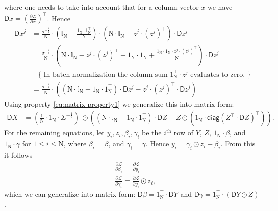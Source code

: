\documentclass{article}
\newcommand{\const}[1]{\ensuremath{\mathrm{#1}}} %
\newcommand{\func}[1]{\ensuremath{\textsf{#1}}} %
\newcommand{\Gradient}{\textsf{D}}
\newcommand{\Derivative}[2]{\ensuremath{\frac{\partial #1}{\partial #2}}}
\begin{document}
where one needs to take into account that for a column vector $x$ we have $\Gradient x = (\Derivative{\mathcal{L}}{x})^\top$.
Hence
\begin{align*}
    \Gradient x^j 
    &=
    \frac{\sigma^{-\frac{1}{2}}}{\const{N}}
    \cdot
    (\mathbb{I}_{\const{N}} - \frac{1_\const{N} \cdot 1_\const{N}^\top}{\const{N}})
    \cdot 
    \left( 
       \const{N} \cdot \mathbb{I}_{\const{N}} - z^j \cdot (z^j)^\top 
    \right)
    \cdot
    \Gradient z^j
    \\
    &=
    \frac{\sigma^{-\frac{1}{2}}}{\const{N}}
    \cdot
    (
      \const{N} \cdot \mathbb{I}_{\const{N}}
      - z^j \cdot (z^j)^\top
      - 1_\const{N} \cdot 1_\const{N}^\top
      + \frac{1_\const{N} \cdot 1_\const{N}^\top \cdot z^j \cdot (z^j)^\top}{\const{N}}
    )  
    \cdot
    \Gradient z^j
    \\     
      & \ \ \ \  \{ \; \text{In batch normalization the column sum $1_\const{N}^\top \cdot z^j$ evaluates to zero. } \}
    \\ 
    &=
    \frac{\sigma^{-\frac{1}{2}}}{\const{N}}
    \cdot
    (
      (\const{N} \cdot \mathbb{I}_{\const{N}} - 1_\const{N} \cdot 1_\const{N}^\top) \cdot \Gradient z^j
      - z^j \cdot (z^j)^\top \cdot \Gradient z^j
    )  
\end{align*}
Using property \eqref{eq:matrix-property1} we generalize this into matrix-form:
\begin{align} \label{eq:batch-normalization-backpropagation}
\Gradient X
     &= (\frac{1}{\const{N}} \cdot 1_\const{N} \cdot \Sigma^{-\frac{1}{2}}) ~\odot 
      \left(
              (\const{N} \cdot \mathbb{I}_\const{N} - 1_\const{N} \cdot 1_\const{N}^\top) \cdot \Gradient Z
              -
              Z \odot (1_\const{N} \cdot \func{diag}(Z^\top \cdot \Gradient Z)^\top)
       \right).
\end{align}
For the remaining equations, let 
$y_i, z_i, \beta_i, \gamma_i$ be the $i^\text{th}$ row of $Y$, $Z$, $1_\const{N} \cdot \beta$, and $1_\const{N} \cdot \gamma$ for $1 \leq i \leq \const{N}$, where $\beta_i = \beta$, and $\gamma_i = \gamma$. Hence $y_i = \gamma_i \odot z_i + \beta_i$. From this it follows
\begin{align*}
    & \Derivative{\mathcal{L}}{\beta_i} = \Derivative{\mathcal{L}}{y_i}
    \\
    & \Derivative{\mathcal{L}}{\gamma_i} = \Derivative{\mathcal{L}}{y_i} \odot z_i,
\end{align*}
which we can generalize into matrix-form:
$\Gradient \beta = 1_\const{N}^\top \cdot \Gradient Y$ and
$\Gradient \gamma = 1_\const{N}^\top \cdot (\Gradient Y \odot Z)$.
\end{document}
